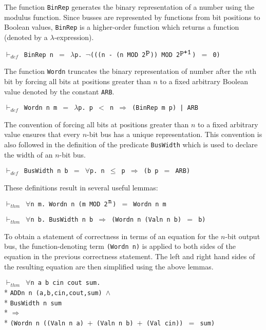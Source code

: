 \begin{normalsize}
The function \verb"BinRep" generates the binary representation
of a number using the modulus function.
Since busses are represented by functions from bit positions
to Boolean values,
\verb"BinRep" is a higher-order function which returns
a function (denoted by a $\lambda$-expression).

$\vdash_{def}$\verb" BinRep n "$=$\verb" "$\lambda$\verb"p. "$\neg$\verb"(((n - (n MOD 2"$^{\verb"p"}$\verb")) MOD 2"$^{\verb"p+1"}$\verb") "$=$\verb" 0)"

The function \verb"Wordn" truncates the binary representation of
number after the $n$th
bit by forcing all bits at positions greater than $n$ to a fixed
arbitrary Boolean value denoted by the constant \verb"ARB".

$\vdash_{def}$\verb" Wordn n m "$=$\verb" "$\lambda$\verb"p. p "$<$\verb" n "$\Rightarrow$\verb" (BinRep m p) | ARB"

The convention of forcing all bits at positions greater than $n$ to
a fixed arbitrary value ensures that every \mbox{$n$-bit} bus has a
unique representation.
This convention is also followed in the definition of the predicate
\verb"BusWidth" which is used to declare the width of an \mbox{$n$-bit} bus.

$\vdash_{def}$\verb" BusWidth n b "$=$\verb" "$\forall$\verb"p. n "$\leq$\verb" p "$\Longrightarrow$\verb" (b p "$=$\verb" ARB)"

These definitions result in several useful lemmas:

$\vdash_{thm}$\verb" "$\forall$\verb"n m. Wordn n (m MOD 2"$^{\verb"n"}$\verb") "$=$\verb" Wordn n m"

$\vdash_{thm}$\verb" "$\forall$\verb"n b. BusWidth n b "$\Longrightarrow$\verb" (Wordn n (Valn n b) "$=$\verb" b)"

To obtain a statement of correctness in terms of an equation for
the \mbox{$n$-bit} output bus, the function-denoting
term \verb"(Wordn n)" is applied
to both sides of the equation in the previous correctness statement.
The left and right hand sides of the resulting equation are
then simplified using the above lemmas.

\begin{minipage}{17cm}
$\vdash_{thm}$\verb" "$\forall$\verb"n a b cin cout sum."\\*
\verb"ADDn n (a,b,cin,cout,sum) "$\wedge$\\*
\verb"BusWidth n sum"\\*
$\Longrightarrow$\\*
\verb"(Wordn n ((Valn n a) "$+$\verb" (Valn n b) "$+$\verb" (Val cin)) "$=$\verb" sum)"
\end{minipage}


\end{normalsize}
